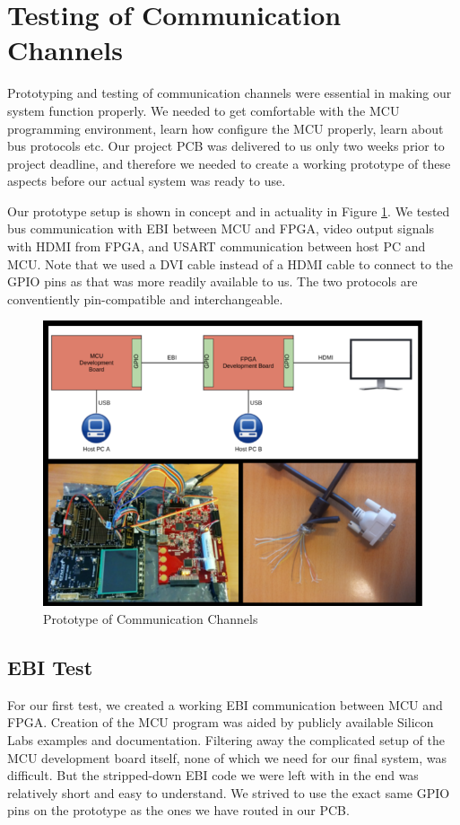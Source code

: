 \section{Testing of Communication Channels}
Prototyping and testing of communication channels were essential in making our system function properly.
We needed to get comfortable with the MCU programming environment, learn how configure the MCU properly, learn about bus protocols etc.
Our project PCB was delivered to us only two weeks prior to project deadline, and therefore we needed to create a working prototype of these aspects before our actual system was ready to use.

Our prototype setup is shown in concept and in actuality in Figure \ref{prototype}.
We tested bus communication with EBI between MCU and FPGA, video output signals with HDMI from FPGA, and USART communication between host PC and MCU.
Note that we used a DVI cable instead of a HDMI cable to connect to the GPIO pins as that was more readily available to us. The two protocols are conventiently pin-compatible and interchangeable.

\begin{figure}[htp]
\centering
\includegraphics[scale=1.00]{diagrams/prototype_complete.png}
\caption{Prototype of Communication Channels}
\label{prototype}
\end{figure}

\subsection{EBI Test}
For our first test, we created a working EBI communication between MCU and FPGA.
Creation of the MCU program was aided by publicly available Silicon Labs examples and documentation.
Filtering away the complicated setup of the MCU development board itself, none of which we need for our final system, was difficult.
But the stripped-down EBI code we were left with in the end was relatively short and easy to understand.
We strived to use the exact same GPIO pins on the prototype as the ones we have routed in our PCB.

